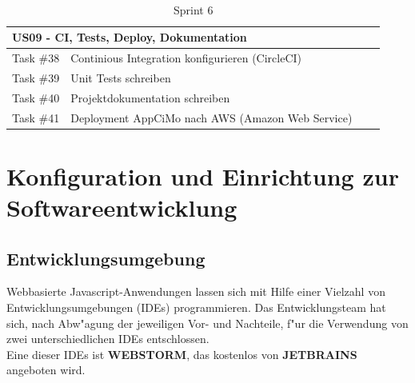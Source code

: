 \documentclass[a4paper, 11pt]{scrreprt}
\begin{document}
\begin{table}[H]

\caption{Sprint 6}

\ \\

\par

\label{tab:Sprint 6}

\centering

\begin{tabular}{|p{2.5cm} p{12cm}| ll}

\hline
\multicolumn{2}{|l|}{US09 - CI, Tests, Deploy, Dokumentation} \\

\hline
Task \#38 & Continious Integration konfigurieren (CircleCI)\\

\hline
Task \#39 & Unit Tests schreiben\\

\hline
Task \#40 & Projektdokumentation schreiben\\

\hline
Task \#41 & Deployment AppCiMo nach AWS (Amazon Web Service)\\

\hline
\end{tabular}

\end{table}

\chapter{Konfiguration und Einrichtung zur Softwareentwicklung}

\section{Entwicklungsumgebung}
Webbasierte Javascript-Anwendungen lassen sich mit Hilfe einer Vielzahl von Entwicklungsumgebungen (IDEs) programmieren.
Das Entwicklungsteam hat sich, nach Abw"agung der jeweiligen Vor- und Nachteile, f"ur die Verwendung von zwei unterschiedlichen IDEs entschlossen.\\

Eine dieser IDEs ist \textbf{WEBSTORM}, das kostenlos von \textbf{JETBRAINS} angeboten wird. \\
\end{document}
